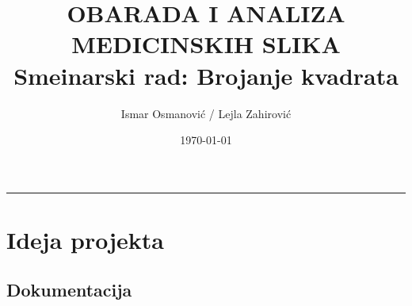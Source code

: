 \documentclass[a4paper,12pt]{article}
\title{OBARADA I ANALIZA MEDICINSKIH SLIKA \\ Smeinarski rad: Brojanje kvadrata}
\author{Ismar Osmanović / Lejla Zahirović}
\date{\today}
\begin{document}
\maketitle

\noindent\rule[7pt]{\linewidth}{0.4pt}


\section{Ideja projekta}
\subsection{Dokumentacija}
\end{document}

